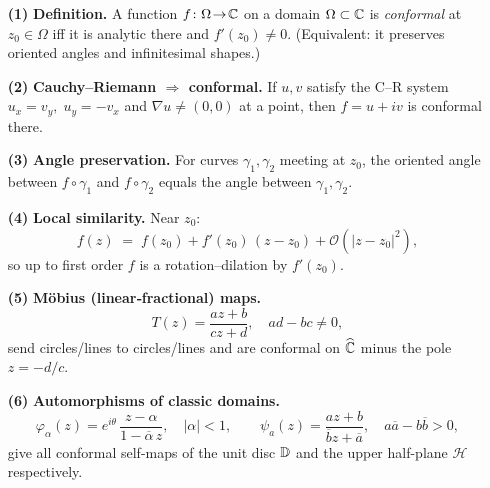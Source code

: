 \documentclass[12pt]{article}
\theoremstyle{definition} %
\theoremstyle{plain} %
\begin{document}
 \begin{itemize}
 \item[\textbf{(1)}] \textbf{Definition.}
       A function \(f\colon\Omega\!\to\!\Bbb C\) on a domain
       \(\Omega\subset\Bbb C\) is \emph{conformal} at
       \(z_{0}\in\Omega\) iff it is analytic there and
       \(f'(z_{0})\neq 0\).
       (Equivalent: it preserves oriented angles and infinitesimal
       shapes.)
 
 \item[\textbf{(2)}] \textbf{Cauchy–Riemann $\Longrightarrow$ conformal.}
       If \(u,v\) satisfy the C–R system
       \(u_{x}=v_{y},\;u_{y}=-v_{x}\) and
       \(\nabla u\neq(0,0)\) at a point, then
       \(f=u+iv\) is conformal there.
 
 \item[\textbf{(3)}] \textbf{Angle preservation.}
       For curves \(\gamma_{1},\gamma_{2}\) meeting at \(z_{0}\),
       the oriented angle between \(f\!\circ\!\gamma_{1}\) and
       \(f\!\circ\!\gamma_{2}\) equals the angle between
       \(\gamma_{1},\gamma_{2}\).
 
 \item[\textbf{(4)}] \textbf{Local similarity.}
       Near \(z_{0}\):
       \[
         f(z) \;=\; f(z_{0}) + f'(z_{0})\,(z-z_{0})
                   + \mathcal O(|z-z_{0}|^{2}),
       \]
       so up to first order \(f\) is a rotation–dilation by
       \(f'(z_{0})\).
 
 \item[\textbf{(5)}] \textbf{Möbius (linear‐fractional) maps.}
       \[
         T(z)=\frac{az+b}{cz+d},
         \quad ad-bc\neq0,
       \]
       send circles/lines to circles/lines and are conformal on
       \(\widehat{\Bbb C}\) minus the pole \(z=-d/c\).
 
 \item[\textbf{(6)}] \textbf{Automorphisms of classic domains.}
       \[
         \varphi_{\alpha}(z)=e^{i\theta}\,
           \frac{z-\alpha}{1-\overline{\alpha}\,z},
         \quad |\alpha|<1,
       \qquad
         \psi_{a}(z)=\frac{az+b}{\overline{b}z+\overline{a}},
         \quad a\overline{a}-b\overline{b}>0,
       \]
       give all conformal self-maps of the unit disc
       \(\Bbb D\) and the upper half-plane \(\mathcal H\)
       respectively.
 

\end{itemize}
\end{document}
